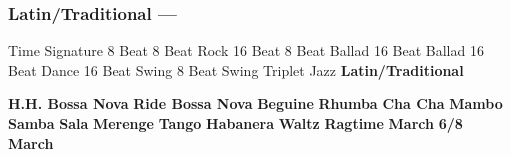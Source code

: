 \subsubsection[Latin/Traditional]{Latin/Traditional --- \UiKey{\II}\UiKey{\MET}}
Time Signature
8 Beat
8 Beat Rock
16 Beat
8 Beat Ballad
16 Beat Ballad
16 Beat Dance
16 Beat Swing
8 Beat Swing
Triplet
Jazz
\textbf{Latin/Traditional}





























\textbf{H.H. Bossa Nova}
\textbf{Ride Bossa Nova}
\textbf{Beguine}
\textbf{Rhumba}
\textbf{Cha Cha}
\textbf{Mambo}
\textbf{Samba}
\textbf{Sala}
\textbf{Merenge}
\textbf{Tango}
\textbf{Habanera}
\textbf{Waltz}
\textbf{Ragtime}
\textbf{March}
\textbf{6/8 March}
